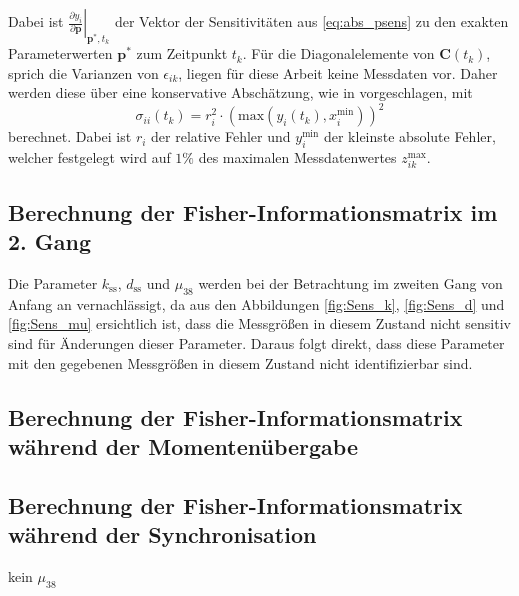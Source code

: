 Dabei ist $\left.\frac{\partial y_i}{\partial \pmb{p}}\right|_{\pmb{p}^*,t_k}$ der Vektor der Sensitivitäten aus \eqref{eq:abs_psens} zu den exakten Parameterwerten $\pmb{p}^*$ zum Zeitpunkt $t_k$. Für die Diagonalelemente von $\pmb{C}(t_k)$, sprich die Varianzen von $\epsilon_{ik}$, liegen für diese Arbeit keine Messdaten vor. Daher werden diese über eine konservative Abschätzung, wie in \cite{Majer.1998} vorgeschlagen, mit
\begin{equation}
\sigma_{ii}(t_k)=r_i^2\cdot\left(\mathrm{max}\left(y_i(t_k),x_i^\mathrm{min}\right)\right)^2
\end{equation}
berechnet. Dabei ist $r_i$ der relative Fehler und $y_i^\mathrm{min}$ der kleinste absolute Fehler, welcher festgelegt wird auf $1\%$ des maximalen Messdatenwertes $z^\mathrm{max}_{ik}$. 

\subsection{Berechnung der Fisher-Informationsmatrix im 2. Gang}
Die Parameter $k_\mathrm{ss}$, $d_\mathrm{ss}$ und $\mu_{38}$ werden bei der Betrachtung im zweiten Gang von Anfang an vernachlässigt, da aus den Abbildungen \ref{fig:Sens_k}, \ref{fig:Sens_d} und \ref{fig:Sens_mu} ersichtlich ist, dass die Messgrößen in diesem Zustand nicht sensitiv sind für Änderungen dieser Parameter. Daraus folgt direkt, dass diese Parameter mit den gegebenen Messgrößen in diesem Zustand nicht identifizierbar sind. 

\subsection{Berechnung der Fisher-Informationsmatrix während der Momentenübergabe}


\subsection{Berechnung der Fisher-Informationsmatrix während der Synchronisation}
kein $\mu_{38}$
